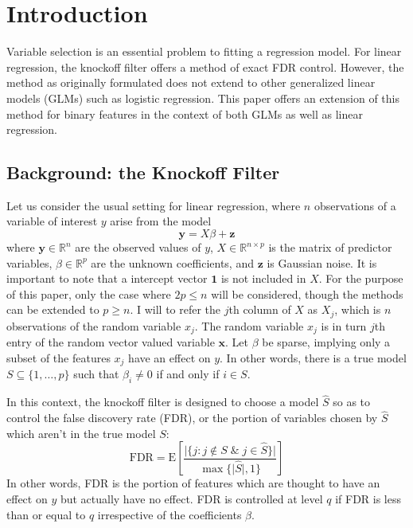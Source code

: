 \documentclass[11pt]{article}
\newcommand{\R}{\mathbb{R}}
\newcommand{\E}{\mathrm{E}}
\theoremstyle{definition}
\begin{document}
\newpage


\section{Introduction}
Variable selection is an essential problem to fitting a regression model. For linear regression, the knockoff filter\cite{2014arXiv1404.5609F} offers a method of exact FDR control. However, the method as originally formulated does not extend to other generalized linear models (GLMs) such as logistic regression. This paper offers an extension of this method for binary features in the context of both GLMs as well as linear regression.
    
\subsection{Background: the Knockoff Filter}
    Let us consider the usual setting for linear regression, where $n$ observations of a variable of interest $y$ arise from the model
    \[\mathbf{y} = X\beta + \mathbf{z}\]
    where $\mathbf{y}\in\R^n$ are the observed values of $y$, $X \in \R^{n\times p}$ is the matrix of predictor variables, $\beta\in\R^p$ are the unknown coefficients, and $\mathbf z$ is Gaussian noise. It is important to note that a intercept vector $\mathbf 1$ is not included in $X$. For the purpose of this paper, only the case where $2p\leq n$ will be considered, though the methods can be extended to $p\geq n$. I will to refer the $j$th column of $X$ as $X_j$, which is $n$ observations of the random variable $x_j$. The random variable $x_j$ is in turn $j$th entry of the random vector valued variable $\mathbf x$. Let $\beta$ be sparse, implying only a subset of the features $x_j$ have an effect on  $y$. In other words, there is a true model $S\subseteq \{1,\ldots,p\}$ such that $\beta_i\neq0$ if and only if $i\in S$. \par
     In this context, the knockoff filter is designed to choose a model $\hat S$ so as to control the false discovery rate (FDR), or the portion of variables chosen by $\hat S$ which aren't in the true model $S$:
    \[ \textrm{FDR} = \E\left[\frac{\vert{\{j: j\not\in S \; \& \; j\in\hat S\}}\vert}{\max\{\vert{\hat S}\vert,1\}} \right] \]
    In other words, FDR is the portion of features which are thought to have an effect on $y$ but actually have no effect. FDR is controlled at level $q$ if FDR is less than or equal to $q$ irrespective of the coefficients $\beta$. \par
\end{document}
